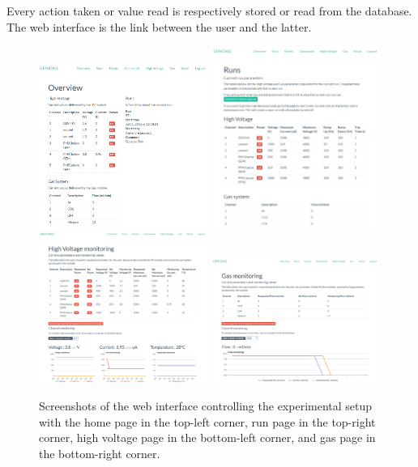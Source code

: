       Every action taken or value read is respectively stored or read from the database. The web interface is the link between the user and the latter.

      \begin{figure}[h!]
        \centering
        \includegraphics[width=0.49\textwidth]{img/III-1-arch/app-home.png}
        \includegraphics[width=0.49\textwidth]{img/III-1-arch/app-runs.png} \\
        \includegraphics[width=0.49\textwidth]{img/III-1-arch/app-hv.png}
        \includegraphics[width=0.49\textwidth]{img/III-1-arch/app-gas.png}
        \caption{Screenshots of the web interface controlling the experimental setup with the home page in the top-left corner, run page in the top-right corner, high voltage page in the bottom-left corner, and gas page in the bottom-right corner.}
        \label{fig:III-1-app}
      \end{figure}

